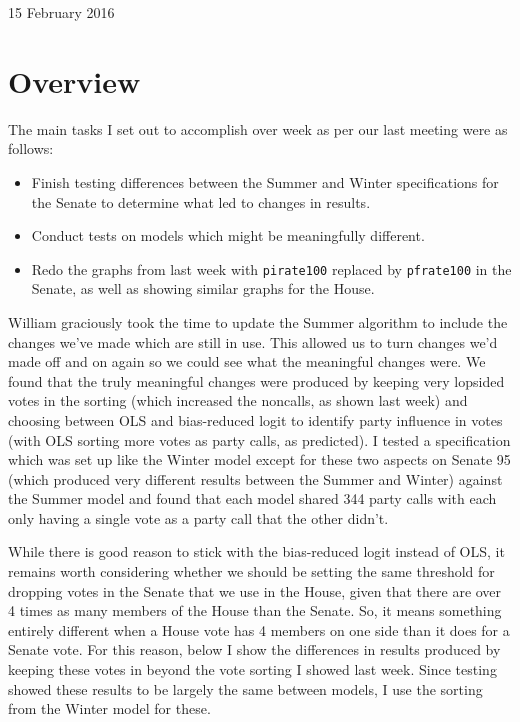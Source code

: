 \documentclass[12pt]{article}
\begin{document}
\begin{center}
\Large 15 February 2016
\end{center}

\section{Overview}

The main tasks I set out to accomplish over week as per our last meeting were as follows:

\begin{itemize}
	\item Finish testing differences between the Summer and Winter specifications for the Senate to determine what led to changes in results.
	
	\item Conduct tests on models which might be meaningfully different.
	
	\item Redo the graphs from last week with \verb|pirate100| replaced by \verb|pfrate100| in the Senate, as well as showing similar graphs for the House.
\end{itemize}

\noindent
William graciously took the time to update the Summer algorithm to include the changes we've made which are still in use. This allowed us to turn changes we'd made off and on again so we could see what the meaningful changes were. We found that the truly meaningful changes were produced by keeping very lopsided votes in the sorting (which increased the noncalls, as shown last week) and choosing between OLS and bias-reduced logit to identify party influence in votes (with OLS sorting more votes as party calls, as predicted). I tested a specification which was set up like the Winter model except for these two aspects on Senate 95 (which produced very different results between the Summer and Winter) against the Summer model and found that each model shared 344 party calls with each only having a single vote as a party call that the other didn't.

While there is good reason to stick with the bias-reduced logit instead of OLS, it remains worth considering whether we should be setting the same threshold for dropping votes in the Senate that we use in the House, given that there are over 4 times as many members of the House than the Senate. So, it means something entirely different when a House vote has 4 members on one side than it does for a Senate vote. For this reason, below I show the differences in results produced by keeping these votes in beyond the vote sorting I showed last week. Since testing showed these results to be largely the same between models, I use the sorting from the Winter model for these. 
\end{document}
